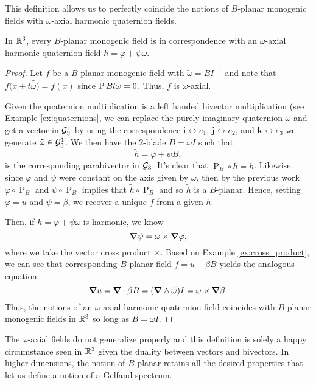 This definition allows us to perfectly coincide the notions of $B$-planar monogenic fields with $\omega$-axial harmonic quaternion fields.
\begin{proposition}
    In $\mathbb{R}^3$, every $B$-planar monogenic field is in correspondence with an $\omega$-axial harmonic quaternion field $h = \varphi + \psi \omega$. 
\end{proposition}
\begin{proof}
    Let $f$ be a $B$-planar monogenic field with $\tilde{\omega}=BI^{-1}$ and note that $f(x+t\tilde{\omega)}=f(x)$ since $\operatorname{P}{B}{t\omega}=0$. Thus, $f$ is $\tilde{\omega}$-axial.
    
    Given the quaternion multiplication is a left handed bivector multiplication (see Example \ref{ex:quaternions}, we can replace the purely imaginary quaternion $\omega$ and get a vector in $\mathcal{G}_3^1$ by using the correspondence $\boldsymbol{i} \leftrightarrow e_1$, $\boldsymbol{j}\leftrightarrow e_2$, and $\boldsymbol{k}\leftrightarrow e_3$ we generate $\tilde{\omega} \in \mathcal{G}_3^1$. We then have the $2$-blade $B=\tilde{\omega} I$ such that
    \[
        \tilde{h} = \varphi + \psi B,
    \]
    is the corresponding parabivector in $\mathcal{G}_3$. It's clear that $\operatorname{P}_B \circ \tilde{h} = \tilde{h}$. Likewise, since $\varphi$ and $\psi$ were constant on the axis given by $\omega$, then by the previous work $\varphi \circ \operatorname{P}_B$ and $\psi \circ \operatorname{P}_B$ implies that $\tilde{h} \circ \operatorname{P}_B$ and so $\tilde{h}$ is a $B$-planar. Hence, setting $\varphi = u$ and $\psi=\beta$, we recover a unique $f$ from a given $h$.

Then, if $h=\varphi + \psi \omega$ is harmonic, we know
\[
\boldsymbol{\nabla} \psi = \omega \times \boldsymbol{\nabla} \varphi,
\]
where we take the vector cross product $\times$.  Based on Example \ref{ex:cross_product}, we can see that corresponding $B$-planar field $f=u+\beta B$ yields the analogous equation
\[
\boldsymbol{\nabla} u = \boldsymbol{\nabla} \cdot \beta B = (\boldsymbol{\nabla} \wedge \tilde{\omega})I = \tilde{\omega } \times \boldsymbol{\nabla} \beta.
\]
Thus, the notions of an $\omega$-axial harmonic quaternion field coincides with $B$-planar monogenic fields in $\mathbb{R}^3$ so long as $B=\tilde{\omega}I$.
\end{proof}

The $\omega$-axial fields do not generalize properly and this definition is solely a happy circumstance seen in $\mathbb{R}^3$ given the duality between vectors and bivectors.  In higher dimensions, the notion of $B$-planar retains all the desired properties that let us define a notion of a Gelfand spectrum.



